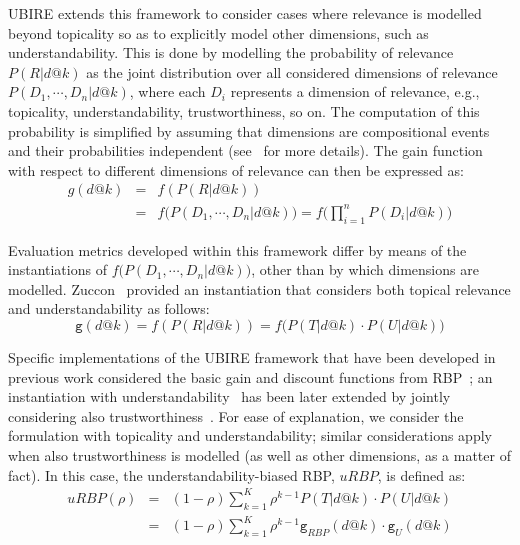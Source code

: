 UBIRE extends this framework to consider cases where relevance is modelled beyond topicality so as to explicitly model other dimensions, such as understandability.
This is done by modelling the probability of relevance $P(R|d@k)$ as the joint distribution over all considered dimensions of relevance $P(D_1, \cdots, D_n|d@k)$, where each $D_i$ represents a dimension of relevance, e.g., topicality, understandability, trustworthiness, so on. The computation of this probability is simplified by assuming that dimensions are compositional events and their probabilities independent (see~\cite{zuccon16} for more details). The gain function with respect to different dimensions of relevance can then be expressed as:
%
%
\begin{eqnarray*}
    g(d@k) &=& f(P(R|d@k)) \\
    &=& f\big(P(D_1, \cdots, D_n|d@k)\big) = f\Big(\prod_{i=1}^n P(D_i|d@k)\Big) 
\end{eqnarray*}


Evaluation metrics developed within this framework differ by means of the instantiations of $f\big(P(D_1, \cdots, D_n|d@k)\big)$, other than by which dimensions are modelled. Zuccon~\cite{zuccon16} provided an instantiation that considers both topical relevance and understandability as follows:
%
\begin{equation*}
\mathtt{g}(d@k) = f(P(R|d@k)) = f\big(P(T|d@k) \cdot P(U|d@k)\big)
\end{equation*}
%

Specific implementations of the UBIRE framework that have been developed in previous work considered the basic gain and discount functions from RBP~\cite{moffat08}; an instantiation with understandability~\cite{zuccon14,zuccon16} has been later extended by jointly considering also trustworthiness~\cite{clef17}. For ease of explanation, we consider the formulation with topicality and understandability; similar considerations apply when also trustworthiness is modelled (as well as other dimensions, as a matter of fact). In this case, the understandability-biased RBP, $uRBP$, is defined as: 
%
\begin{eqnarray*}
    uRBP(\rho) &=& (1-\rho) \sum_{k=1}^{K} \rho^{k-1} P(T|d@k) \cdot P(U|d@k)\\ 
&=& (1-\rho) \sum_{k=1}^{K} \rho^{k-1} \mathtt{g}_{RBP}(d@k) \cdot \mathtt{g}_{U}(d@k)
\label{eq:RBP}
\end{eqnarray*}


